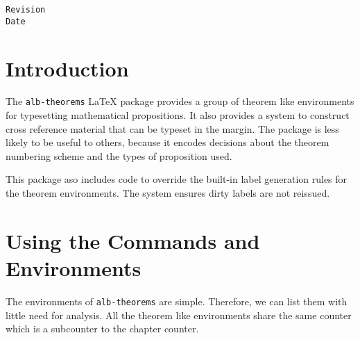 \documentclass[11pt,a4paper,oneside,titlepage]{alb-latex}
\begin{document}
\begin{albTitlePage}

  \verb$Revision$\\
  \verb$Date$

\end{albTitlePage}




\section{Introduction}
\label{sec:alb-theorems-documentation:intr}

The \texttt{alb-theorems} \LaTeX{} package provides a group of theorem
like environments for typesetting mathematical propositions.  It also
provides a system to construct cross reference material that can be
typeset in the margin.  The package is less likely to be useful to
others, because it encodes decisions about the theorem numbering scheme
and the types of proposition used.

This package aso includes \AUCTeX{} code to override the built-in label
generation rules for the theorem environments.  The system ensures dirty
labels are not reissued.




\section{Using the Commands and Environments}
\label{sec:alb-theorems-documentation:using-comm-envir}

The environments of \texttt{alb-theorems} are simple.  Therefore, we can
list them with little need for analysis.  All the theorem like
environments share the same counter which is a subcounter to the chapter
counter.
\end{document}
